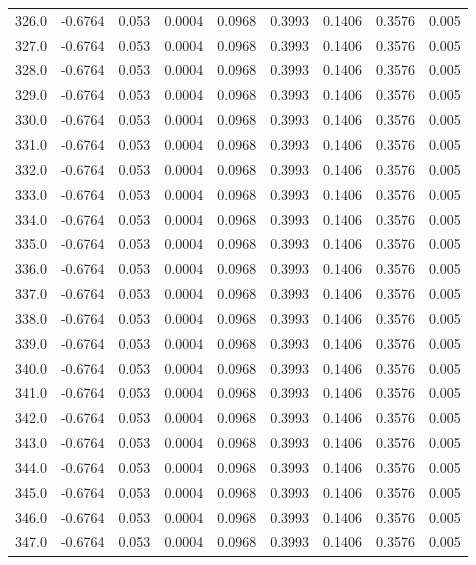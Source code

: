 \begin{longtable}{lrrrrrrrr}
326.0 & -0.6764 & 0.053 & 0.0004 & 0.0968 & 0.3993 & 0.1406 & 0.3576 & 0.005 \\
327.0 & -0.6764 & 0.053 & 0.0004 & 0.0968 & 0.3993 & 0.1406 & 0.3576 & 0.005 \\
328.0 & -0.6764 & 0.053 & 0.0004 & 0.0968 & 0.3993 & 0.1406 & 0.3576 & 0.005 \\
329.0 & -0.6764 & 0.053 & 0.0004 & 0.0968 & 0.3993 & 0.1406 & 0.3576 & 0.005 \\
330.0 & -0.6764 & 0.053 & 0.0004 & 0.0968 & 0.3993 & 0.1406 & 0.3576 & 0.005 \\
331.0 & -0.6764 & 0.053 & 0.0004 & 0.0968 & 0.3993 & 0.1406 & 0.3576 & 0.005 \\
332.0 & -0.6764 & 0.053 & 0.0004 & 0.0968 & 0.3993 & 0.1406 & 0.3576 & 0.005 \\
333.0 & -0.6764 & 0.053 & 0.0004 & 0.0968 & 0.3993 & 0.1406 & 0.3576 & 0.005 \\
334.0 & -0.6764 & 0.053 & 0.0004 & 0.0968 & 0.3993 & 0.1406 & 0.3576 & 0.005 \\
335.0 & -0.6764 & 0.053 & 0.0004 & 0.0968 & 0.3993 & 0.1406 & 0.3576 & 0.005 \\
336.0 & -0.6764 & 0.053 & 0.0004 & 0.0968 & 0.3993 & 0.1406 & 0.3576 & 0.005 \\
337.0 & -0.6764 & 0.053 & 0.0004 & 0.0968 & 0.3993 & 0.1406 & 0.3576 & 0.005 \\
338.0 & -0.6764 & 0.053 & 0.0004 & 0.0968 & 0.3993 & 0.1406 & 0.3576 & 0.005 \\
339.0 & -0.6764 & 0.053 & 0.0004 & 0.0968 & 0.3993 & 0.1406 & 0.3576 & 0.005 \\
340.0 & -0.6764 & 0.053 & 0.0004 & 0.0968 & 0.3993 & 0.1406 & 0.3576 & 0.005 \\
341.0 & -0.6764 & 0.053 & 0.0004 & 0.0968 & 0.3993 & 0.1406 & 0.3576 & 0.005 \\
342.0 & -0.6764 & 0.053 & 0.0004 & 0.0968 & 0.3993 & 0.1406 & 0.3576 & 0.005 \\
343.0 & -0.6764 & 0.053 & 0.0004 & 0.0968 & 0.3993 & 0.1406 & 0.3576 & 0.005 \\
344.0 & -0.6764 & 0.053 & 0.0004 & 0.0968 & 0.3993 & 0.1406 & 0.3576 & 0.005 \\
345.0 & -0.6764 & 0.053 & 0.0004 & 0.0968 & 0.3993 & 0.1406 & 0.3576 & 0.005 \\
346.0 & -0.6764 & 0.053 & 0.0004 & 0.0968 & 0.3993 & 0.1406 & 0.3576 & 0.005 \\
347.0 & -0.6764 & 0.053 & 0.0004 & 0.0968 & 0.3993 & 0.1406 & 0.3576 & 0.005 \\

\end{longtable}
